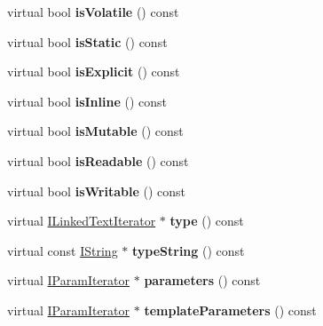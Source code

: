 \begin{DoxyCompactItemize}
virtual bool {\bfseries is\+Volatile} () const
\item 
\mbox{\label{class_member_handler_ac514647f3b66ad292dc32827061a300c}} 
virtual bool {\bfseries is\+Static} () const
\item 
\mbox{\label{class_member_handler_ab5cdf8b0127ee31d94aad4eed1c0cb9e}} 
virtual bool {\bfseries is\+Explicit} () const
\item 
\mbox{\label{class_member_handler_a7d7192fbd9769f1e9060fd885817c43d}} 
virtual bool {\bfseries is\+Inline} () const
\item 
\mbox{\label{class_member_handler_a09886f3fd5473df1810894cc307959cf}} 
virtual bool {\bfseries is\+Mutable} () const
\item 
\mbox{\label{class_member_handler_affba9b0d1277fc9d877169c8195fe0fb}} 
virtual bool {\bfseries is\+Readable} () const
\item 
\mbox{\label{class_member_handler_aa8e37893c77ccbd08ce2634f7ae3f67f}} 
virtual bool {\bfseries is\+Writable} () const
\item 
\mbox{\label{class_member_handler_ab0439ca9d22bd7621484b8a160ac39d2}} 
virtual \mbox{\hyperlink{class_i_linked_text_iterator}{I\+Linked\+Text\+Iterator}} $\ast$ {\bfseries type} () const
\item 
\mbox{\label{class_member_handler_a6963f31c059ddea87b9b9d3d5e8a1cdb}} 
virtual const \mbox{\hyperlink{class_i_string}{I\+String}} $\ast$ {\bfseries type\+String} () const
\item 
\mbox{\label{class_member_handler_a6cbb6d9086651a76c1548d0eebc71d97}} 
virtual \mbox{\hyperlink{class_i_param_iterator}{I\+Param\+Iterator}} $\ast$ {\bfseries parameters} () const
\item 
\mbox{\label{class_member_handler_ae0c2076d77fd374b87348b64062bb58b}} 
virtual \mbox{\hyperlink{class_i_param_iterator}{I\+Param\+Iterator}} $\ast$ {\bfseries template\+Parameters} () const

\end{DoxyCompactItemize}

